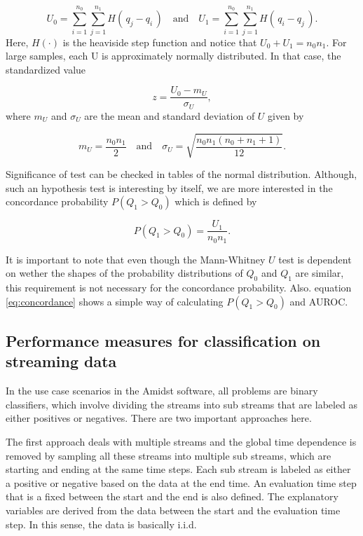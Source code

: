 \begin{equation}
\label{eq:U}
U_0 = \sum_{i=1}^{n_0}\sum_{j=1}^{n_1} H(\,q_j - q_i    \,) \quad \mbox{and} \quad 
U_1 = \sum_{i=1}^{n_0}\sum_{j=1}^{n_1} H( \,q_i - q_j    \,).
\end{equation}
Here, $H(\cdot)$ is the heaviside step function and notice that $U_0 + U_1 = n_0n_1$.  For large samples, each U is approximately normally distributed. In that case, the standardized value

\begin{equation}
\label{eq:z}
z = \frac{U_0 - m_{U}}{\sigma_{U}},
\end{equation}
where $m_U$ and $\sigma_U$ are the mean and standard deviation of $U$ given by

\begin{equation}
\label{eq:z}
m_U = \frac{n_0n_1}{2} \quad \mbox{and} \quad 
\sigma_U = \sqrt{\frac{n_0n_1(n_0 + n_1 + 1)}{12} }.
\end{equation}

Significance of test can be checked in tables of the normal distribution.  Although, such an hypothesis test is interesting by itself, we are more interested in the concordance probability $P(Q_1 > Q_0)$ which is defined by

\begin{equation}
\label{eq:concordance}
P(Q_1 > Q_0) = \frac{U_1}{n_0n_1}.
\end{equation}

It is important to note that even though the Mann-Whitney $U$ test is dependent on wether the shapes of the probability distributions of $Q_0$ and $Q_1$ are similar, this requirement is not necessary for the concordance probability.  Also. equation \eqref{eq:concordance} shows a simple way of calculating $P(Q_1 > Q_0)$ and AUROC.

\subsection{Performance measures for classification on streaming data}
\label{sec:stream}

In the use case scenarios in the Amidst software, all problems are binary classifiers, which involve dividing the streams into sub streams that are labeled as either positives or negatives.  There are two important approaches here.

The first approach deals with multiple streams and the global time dependence is removed by sampling all these streams into multiple sub streams, which are starting and ending at the same time steps.  Each sub stream is labeled as either a positive or negative based on the data at the end time.  An evaluation time step that is a fixed between the start and the end is also defined.  The explanatory variables are derived from the data between the start and the evaluation time step.  In this sense, the data is basically i.i.d.

